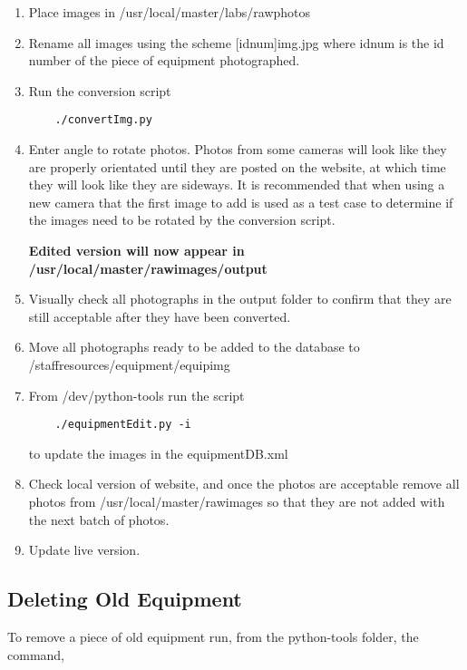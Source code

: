 \documentclass[justified]{book}
\begin{document}
\begin{enumerate}
\item Place images in /usr/local/master/labs/rawphotos
\item Rename all images using the scheme [idnum]img.jpg where idnum is the id number of the piece of equipment photographed.
\item Run the conversion script

	\begin{lstlisting}
	./convertImg.py       
	\end{lstlisting}

\item Enter angle to rotate photos. Photos from some cameras will look like they are properly orientated until they are posted on the website, at which time they will look like they are sideways. It is recommended that when using a new camera that the first image to add is used as a test case to determine if the images need to be rotated by the conversion script.

{\bf Edited version will now appear in /usr/local/master/rawimages/output}

\item Visually check all photographs in the output folder to confirm that they are still acceptable after they have been converted.

\item Move all photographs ready to be added to the database to /staffresources/equipment/equipimg
\item From /dev/python-tools run the script

	\begin{lstlisting}
	./equipmentEdit.py -i
	\end{lstlisting}

to update the images in the equipmentDB.xml

\item Check local version of website, and once the photos are acceptable remove all photos from /usr/local/master/rawimages so that they are not added with the next batch of photos.

\item Update live version.
\end{enumerate}

\subsection{Deleting Old Equipment}

To remove a piece of old equipment run, from the python-tools folder, the command,
\end{document}

